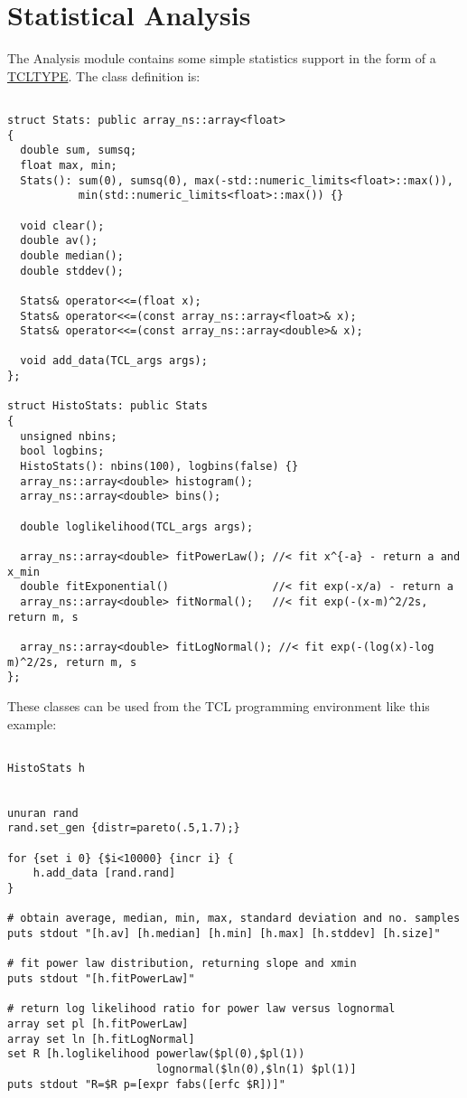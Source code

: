 \section{Statistical Analysis}

The Analysis module contains some simple statistics support in the
form of a \hyperref{TCL exported C++ data type}{TCL exported C++ data
  type (\S}{)}{TCLTYPE}. The class definition is:

\begin{verbatim}

struct Stats: public array_ns::array<float>
{
  double sum, sumsq;
  float max, min;
  Stats(): sum(0), sumsq(0), max(-std::numeric_limits<float>::max()), 
           min(std::numeric_limits<float>::max()) {}

  void clear();
  double av();
  double median();
  double stddev();

  Stats& operator<<=(float x);
  Stats& operator<<=(const array_ns::array<float>& x);
  Stats& operator<<=(const array_ns::array<double>& x);

  void add_data(TCL_args args); 
};

struct HistoStats: public Stats
{
  unsigned nbins;
  bool logbins;
  HistoStats(): nbins(100), logbins(false) {}
  array_ns::array<double> histogram();
  array_ns::array<double> bins();

  double loglikelihood(TCL_args args);

  array_ns::array<double> fitPowerLaw(); //< fit x^{-a} - return a and x_min
  double fitExponential()                //< fit exp(-x/a) - return a 
  array_ns::array<double> fitNormal();   //< fit exp(-(x-m)^2/2s, return m, s
    
  array_ns::array<double> fitLogNormal(); //< fit exp(-(log(x)-log m)^2/2s, return m, s
};
\end{verbatim}

These classes can be used from the TCL programming environment like
this example:

\begin{verbatim}

HistoStats h


unuran rand
rand.set_gen {distr=pareto(.5,1.7);}

for {set i 0} {$i<10000} {incr i} {
    h.add_data [rand.rand]
}

# obtain average, median, min, max, standard deviation and no. samples
puts stdout "[h.av] [h.median] [h.min] [h.max] [h.stddev] [h.size]"

# fit power law distribution, returning slope and xmin
puts stdout "[h.fitPowerLaw]"

# return log likelihood ratio for power law versus lognormal
array set pl [h.fitPowerLaw]
array set ln [h.fitLogNormal]
set R [h.loglikelihood powerlaw($pl(0),$pl(1)) 
                       lognormal($ln(0),$ln(1) $pl(1)]
puts stdout "R=$R p=[expr fabs([erfc $R])]"
\end{verbatim}

